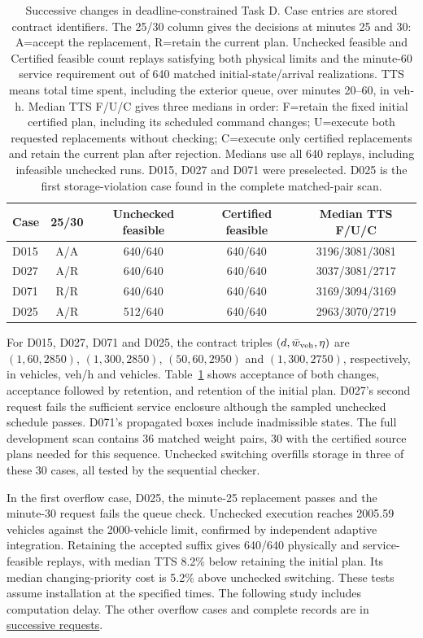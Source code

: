 \documentclass[preprint,12pt]{elsarticle}
\newcommand{\reproductiondetails}[1]{\href{https://github.com/AlienEslami/agentic-perimeter-runtime-certification/blob/main/paper/supporting_materials/REPRODUCING_THE_REDUCED_PAPER.md}{#1}}
\begin{document}
\begin{table}[t]
\centering\small
\caption{Successive changes in deadline-constrained Task D. Case entries
are stored contract identifiers. The 25/30 column gives the decisions at
minutes 25 and 30: A=accept the replacement, R=retain the current plan.
Unchecked feasible and Certified feasible count replays satisfying both
physical limits and the minute-60 service requirement out of 640 matched
initial-state/arrival realizations. TTS means total time spent, including
the exterior queue, over minutes 20--60, in veh-h.
Median TTS F/U/C gives three medians in order: F=retain the fixed initial
certified plan, including its scheduled command changes; U=execute both
requested replacements without checking; C=execute only certified
replacements and retain the current plan after rejection. Medians use all
640 replays, including infeasible unchecked runs. D015, D027 and D071 were
preselected. D025 is the first storage-violation case found in the complete
matched-pair scan.}
\label{tab:sequential-handover}
\setlength{\tabcolsep}{4pt}
\begin{tabular}{@{}lcccc@{}}
\toprule
Case & 25/30 & Unchecked feasible & Certified feasible & Median TTS F/U/C\\
\midrule
D015 & A/A & 640/640 & 640/640 & 3196/3081/3081\\
D027 & A/R & 640/640 & 640/640 & 3037/3081/2717\\
D071 & R/R & 640/640 & 640/640 & 3169/3094/3169\\
D025 & A/R & 512/640 & 640/640 & 2963/3070/2719\\
\bottomrule
\end{tabular}
\end{table}

For D015, D027, D071 and D025, the contract triples
$(d,\bar w_{\rm veh},\eta)$ are $(1,60,2850)$, $(1,300,2850)$,
$(50,60,2950)$ and $(1,300,2750)$, respectively, in vehicles, veh/h
and vehicles. Table~\ref{tab:sequential-handover} shows acceptance of both changes,
acceptance followed by retention, and retention of the initial plan.
D027's second request fails the sufficient service enclosure although
the sampled unchecked schedule passes. D071's propagated boxes include
inadmissible states. The full development scan contains 36 matched weight
pairs, 30 with the certified source plans needed for this sequence.
Unchecked switching overfills storage in three of these 30 cases, all
tested by the sequential checker.

In the first overflow case, D025, the minute-25 replacement passes and
the minute-30 request fails the queue check. Unchecked execution reaches
2005.59 vehicles against the 2000-vehicle limit, confirmed by independent
adaptive integration. Retaining the accepted suffix gives 640/640
physically and service-feasible replays, with median TTS 8.2\% below
retaining the initial plan. Its median changing-priority cost is 5.2\% above
unchecked switching. These tests assume installation at the specified
times. The following study includes computation delay. The other overflow
cases and complete records are in \reproductiondetails{successive requests}.
\end{document}
